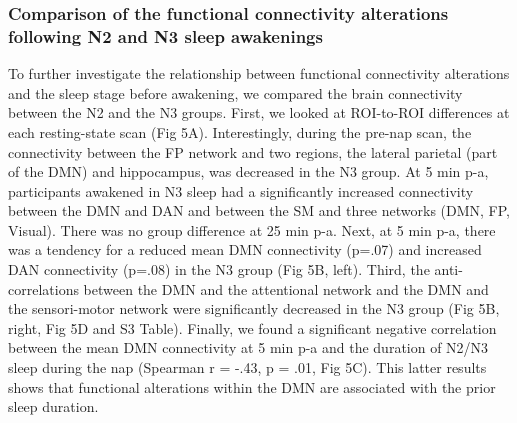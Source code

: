 \subsubsection*{Comparison of the functional connectivity alterations following N2 and N3 sleep awakenings}
To further investigate the relationship between functional connectivity alterations and the sleep stage before awakening, we compared the brain connectivity between the N2 and the N3 groups. First, we looked at ROI-to-ROI differences at each resting-state scan (Fig 5A). Interestingly, during the pre-nap scan, the connectivity between the FP network and two regions, the lateral parietal (part of the DMN) and hippocampus, was decreased in the N3 group. At 5 min p-a, participants awakened in N3 sleep had a significantly increased connectivity between the DMN and DAN and between the SM and three networks (DMN, FP, Visual). There was no group difference at 25 min p-a. Next, at 5 min p-a, there was a tendency for a reduced mean DMN connectivity (p=.07) and increased DAN connectivity (p=.08) in the N3 group (Fig 5B, left). Third, the anti-correlations between the DMN and the attentional network and the DMN and the sensori-motor network were significantly decreased in the N3 group (Fig 5B, right, Fig 5D and S3 Table). Finally, we found a significant negative correlation between the mean DMN connectivity at 5 min p-a and the duration of N2/N3 sleep during the nap (Spearman r = -.43, p = .01, Fig 5C). This latter results shows that functional alterations within the DMN are associated with the prior sleep duration.

